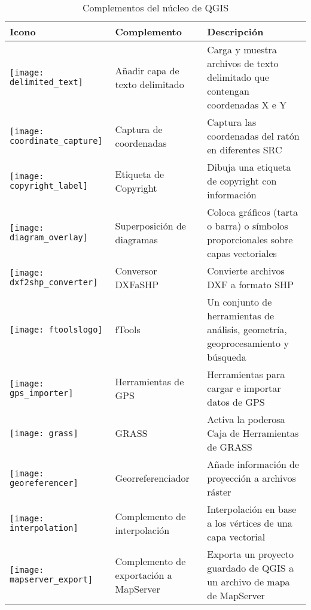 \begin{minipage}{\textwidth}
\begin{table}[H]
\centering
\caption{Complementos del núcleo de QGIS}\label{tab:core_plugins}\medskip
\small
 \begin{tabular}{|l|l|p{4in}|}
\hline \textbf{Icono} & \textbf{Complemento} & \textbf{Descripción}\\
\hline
\texttt{[image: delimited\_text]}
 & Añadir capa de texto delimitado \index{plugins!delimited text} & Carga y muestra archivos de texto delimitado que contengan coordenadas X e Y\\
\hline
\texttt{[image: coordinate\_capture]}
 & Captura de coordenadas \index{plugins!coordinate capture}& Captura las coordenadas del ratón en diferentes SRC\\
\hline 
\texttt{[image: copyright\_label]}
 & Etiqueta de Copyright \index{plugins!copyright}& Dibuja una etiqueta de copyright con información\\
\hline
\texttt{[image: diagram\_overlay]}
 & Superposición de diagramas \index{plugins!diagram}& Coloca gráficos (tarta o barra) o símbolos proporcionales sobre capas vectoriales\\
\hline
\texttt{[image: dxf2shp\_converter]}
 & Conversor DXFaSHP \index{plugins!DXF2Shape}& Convierte archivos DXF a formato SHP\\
\hline
\texttt{[image: ftoolslogo]}
 & fTools \index{plugins!ftools}& Un conjunto de herramientas de análisis, geometría, geoprocesamiento y búsqueda\\
\hline
\texttt{[image: gps\_importer]}
 & Herramientas de GPS \index{plugins!gps}& Herramientas para cargar e importar datos de GPS\\
\hline
\texttt{[image: grass]}
 & GRASS \index{plugin!grass toolbox} & Activa la poderosa Caja de Herramientas de GRASS\\
\hline
\texttt{[image: georeferencer]}
 & Georreferenciador \index{plugin!georeferencer} & Añade información de proyección a archivos ráster\\
\hline
\texttt{[image: interpolation]}
& Complemento de interpolación \index{plugins!Interpolation}& Interpolación en base a los vértices de una capa vectorial\\
\hline
\texttt{[image: mapserver\_export]}
& Complemento de exportación a MapServer \index{plugins!MapServer Export}& Exporta un proyecto guardado de QGIS a un archivo de mapa de MapServer \\

\end{tabular}
\end{table}
\end{minipage}
